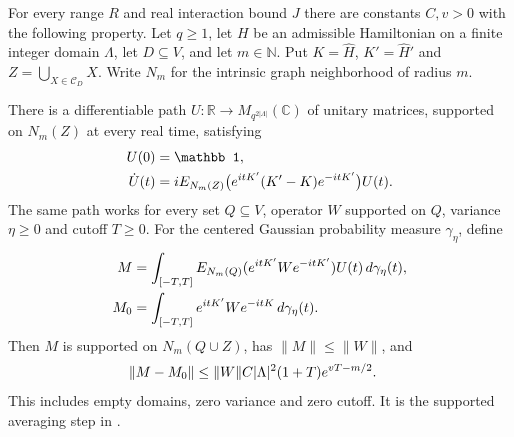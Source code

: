 \begin{lemma}
    \label{thm:domain_supported_gaussian_integral}
    \leanok
    For every range $R$ and real interaction bound $J$ there are constants
    $C,v>0$ with the following property. Let $q\ge1$, let $H$ be an admissible
    Hamiltonian on a finite integer domain $\Lambda$, let $D\subseteq V$, and
    let $m\in\mathbb N$. Put $K=\widehat H$, $K'=\widehat H'$ and
    $Z=\bigcup_{X\in\mathcal C_D}X$. Write $N_m$ for the intrinsic graph
    neighborhood of radius $m$.

    There is a differentiable path $U:\mathbb R\to M_{q^{2|\Lambda|}}(\mathbb C)$
    of unitary matrices, supported on $N_m(Z)$ at every real time, satisfying
    \begin{align}
        U(0)      & =\mathbb 1,\notag                                          \\
        \dot U(t) & =iE_{N_m(Z)}\bigl(e^{itK'}(K'-K)e^{-itK'}\bigr)U(t).\notag
    \end{align}
    The same path works for every set $Q\subseteq V$, operator $W$ supported
    on $Q$, variance $\eta\ge0$ and cutoff $T\ge0$. For the centered Gaussian
    probability measure $\gamma_\eta$, define
    \begin{align}
        M   & =\int_{[-T,T]}E_{N_m(Q)}(e^{itK'}We^{-itK'})U(t)\,d\gamma_\eta(t),\notag \\
        M_0 & =\int_{[-T,T]}e^{itK'}We^{-itK}\,d\gamma_\eta(t).\notag
    \end{align}
    Then $M$ is supported on $N_m(Q\cup Z)$, has $\|M\|\le\|W\|$, and
    \begin{align}
        \|M-M_0\| & \le\|W\|C|\Lambda|^2(1+T)e^{vT-m/2}.\notag
    \end{align}
    This includes empty domains, zero variance and zero cutoff.
    It is the supported averaging step in
    \cite[Part~IIa]{TNLean2026OneDimensional}.
\end{lemma}
